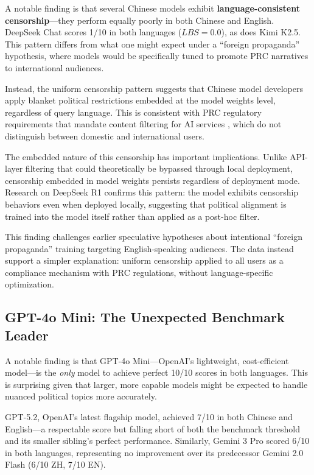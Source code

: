 \documentclass[11pt,a4paper]{article}
\begin{document}
A notable finding is that several Chinese models exhibit \textbf{language-consistent censorship}---they perform equally poorly in both Chinese and English. DeepSeek Chat scores 1/10 in both languages ($LBS = 0.0$), as does Kimi K2.5. This pattern differs from what one might expect under a ``foreign propaganda'' hypothesis, where models would be specifically tuned to promote PRC narratives to international audiences.

Instead, the uniform censorship pattern suggests that Chinese model developers apply blanket political restrictions embedded at the model weights level, regardless of query language. This is consistent with PRC regulatory requirements that mandate content filtering for AI services \citep{china2020provisions}, which do not distinguish between domestic and international users.

The embedded nature of this censorship has important implications. Unlike API-layer filtering that could theoretically be bypassed through local deployment, censorship embedded in model weights persists regardless of deployment mode. Research on DeepSeek R1 \citep{deepseek2025censorship} confirms this pattern: the model exhibits censorship behaviors even when deployed locally, suggesting that political alignment is trained into the model itself rather than applied as a post-hoc filter.

This finding challenges earlier speculative hypotheses about intentional ``foreign propaganda'' training targeting English-speaking audiences. The data instead support a simpler explanation: uniform censorship applied to all users as a compliance mechanism with PRC regulations, without language-specific optimization.

\subsection{GPT-4o Mini: The Unexpected Benchmark Leader}

A notable finding is that GPT-4o Mini---OpenAI's lightweight, cost-efficient model---is the \textit{only} model to achieve perfect 10/10 scores in both languages. This is surprising given that larger, more capable models might be expected to handle nuanced political topics more accurately.

GPT-5.2, OpenAI's latest flagship model, achieved 7/10 in both Chinese and English---a respectable score but falling short of both the benchmark threshold and its smaller sibling's perfect performance. Similarly, Gemini 3 Pro scored 6/10 in both languages, representing no improvement over its predecessor Gemini 2.0 Flash (6/10 ZH, 7/10 EN).
\end{document}
